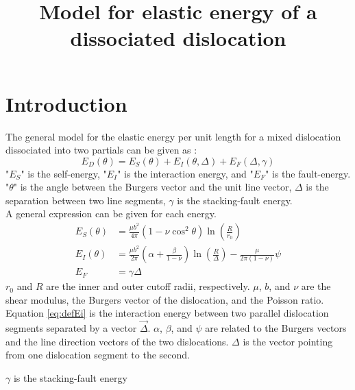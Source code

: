 \documentclass[10pt,a4paper,final]{article}
\title{Model for elastic energy of a dissociated dislocation}
\begin{document}
\section{Introduction}

The general model for the elastic energy per unit length for a mixed dislocation dissociated into two partials can be given as \cite{bacon78}:
\begin{equation}
E_D(\theta) = E_S(\theta) + E_I(\theta,\Delta) + E_F(\Delta,\gamma) \label{eqbacon}
\end{equation}
"$E_S$" is the self-energy, "$E_I$" is the interaction energy, and "$E_F$" is the fault-energy. "$\theta$" is the angle between the Burgers vector and the unit line vector, $\Delta$ is the separation between two line segments, $\gamma$ is the stacking-fault energy.\\

A general expression can be given for each energy.
\begin{subequations}
\begin{align}
E_S(\theta) & = \frac{\mu b^2}{4\pi}\left(1-\nu\cos^2\theta\right)\ln\left(\frac{R}{r_0}\right) \label{eq:ltmodel}\\
E_I(\theta) & = \frac{\mu b^2}{2\pi}\left(\alpha+\frac{\beta}{1-\nu}\right)\ln\left(\frac{R}{\Delta}\right)-\frac{\mu}{2\pi(1-\nu)}\psi \label{eq:defEi}\\
E_F & = \gamma \Delta \label{eq:defEf}
\end{align}
\end{subequations}
$r_0$ and $R$ are the inner and outer cutoff radii, respectively. $\mu$, $b$, and $\nu$ are the shear modulus, the Burgers vector of the dislocation, and the Poisson ratio.\\

Equation \ref{eq:defEi} is the interaction energy between two parallel dislocation segments separated by a vector $\vec{\Delta}$. $\alpha$, $\beta$, and $\psi$ are related to the Burgers vectors and the line direction vectors of the two dislocations. $\Delta$ is the vector pointing from one dislocation segment to the second.

$\gamma$ is the stacking-fault energy
\end{document}
